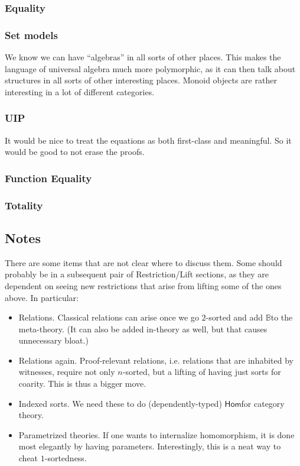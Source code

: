 \documentclass[a4paper,UKenglish,cleveref, autoref, thm-restate]{lipics-v2021}
\newcommand{\bool}{\ensuremath{\mathbb{B}}}
\newcommand{\Hom}{\ensuremath{\mathsf{Hom}}}
\begin{document}
\subsubsection{Equality}

\subsubsection{Set models}
We know we can have ``algebras'' in all sorts of other places. This makes
the language of universal algebra much more polymorphic, as it can then
talk about structures in all sorts of other interesting places.
Monoid objects are rather interesting in a lot of different categories.

\subsubsection{UIP}
It would be nice to treat the equations as both first-class and meaningful.
So it would be good to not erase the proofs.

\subsubsection{Function Equality}

\subsubsection{Totality}

\subsection{Notes}

There are some items that are not clear where to discuss them. Some
should probably be in a subsequent pair of Restriction/Lift sections,
as they are dependent on seeing new restrictions that arise from lifting
some of the ones above.  In particular:

\begin{itemize}
\item Relations. Classical relations can arise once we go $2$-sorted and
add \bool to the meta-theory. (It can also be added in-theory as well,
but that causes unnecessary bloat.)
\item Relations again. Proof-relevant relations, i.e. relations that are
inhabited by witnesses, require not only $n$-sorted, but a lifting of
having just sorts for coarity. This is thus a bigger move.
\item Indexed sorts. We need these to do (dependently-typed) \Hom for
category theory.
\item Parametrized theories. If one wants to internalize homomorphism, it
is done most elegantly by having parameters. Interestingly, this is a neat
way to cheat $1$-sortedness.
\end{itemize}

% 
\end{document}
